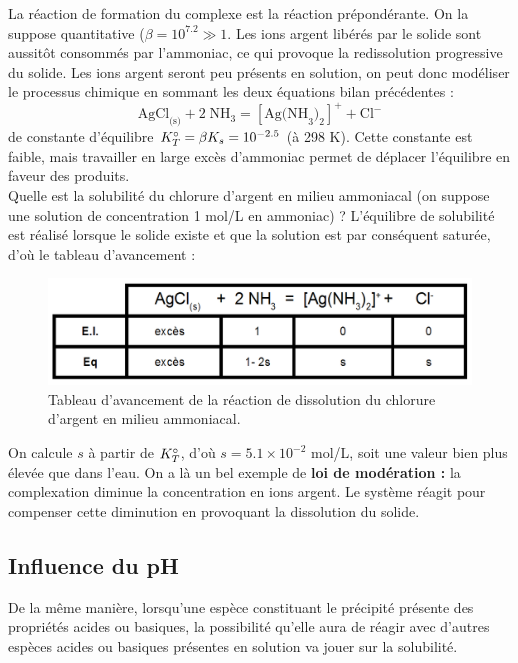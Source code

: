 \documentclass[11pt,a4paper]{report}
\begin{document}
La réaction de formation du complexe est la réaction prépondérante. On la suppose quantitative ($\beta = 10^{7.2} \gg 1$. Les ions argent libérés par le solide sont aussitôt consommés par l'ammoniac, ce qui provoque la redissolution progressive du solide. Les ions argent seront peu présents en solution, on peut donc modéliser le processus chimique en sommant les deux équations bilan précédentes :
\begin{equation}
	\boxed{\text{AgCl}_\text{(s)} + 2\;\text{NH}_3 = [\text{Ag(NH}_3)_2]^+ + \text{Cl}^-}
\end{equation} 
de constante d'équilibre $K_T\degree = \beta K_s = 10^{-2.5}$ (à 298 K). Cette constante est faible, mais travailler en large excès d'ammoniac permet de déplacer l'équilibre en faveur des produits.\\

Quelle est la solubilité du chlorure d'argent en milieu ammoniacal (on suppose une solution de concentration 1 mol/L en ammoniac) ? L'équilibre de solubilité est réalisé lorsque le solide existe et que la solution est par conséquent saturée, d'où le tableau d'avancement :

\begin{figure}[h!]
	\begin{center}
  		\includegraphics[scale = 0.4]{dissolution_agcl.png}
		\caption{Tableau d'avancement de la réaction de dissolution du chlorure d'argent en milieu 						ammoniacal.}
	\end{center}
\end{figure}

On calcule $s$ à partir de $K_T\degree$, d'où $s = 5.1 \times10^{-2}$ mol/L, soit une valeur bien plus élevée que dans l'eau. On a là un bel exemple de \textbf{loi de modération :} la complexation diminue la concentration en ions argent. Le système réagit pour compenser cette diminution en provoquant la dissolution du solide.

\newpage
\subsection{Influence du pH}

De la même manière, lorsqu'une espèce constituant le précipité présente des propriétés acides ou basiques, la possibilité qu'elle aura de réagir avec d'autres espèces acides ou basiques présentes en solution va jouer sur la solubilité.\\
\end{document}

